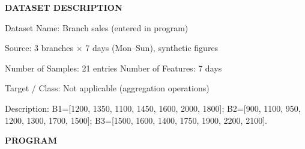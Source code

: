 \documentclass[11pt,twoside]{article}
\newcommand{\expheading}[1]{{\fontsize{14}{17}\selectfont\textbf{#1}\par}}
\begin{document}
{\expheading{DATASET DESCRIPTION}
\vspace{4pt}
\noindent Dataset Name: Branch sales (entered in program)\par
\noindent Source: 3 branches $\times$ 7 days (Mon--Sun), synthetic figures\par
\noindent Number of Samples: 21 entries \hspace{0.3cm} Number of Features: 7 days\par
\noindent Target / Class: Not applicable (aggregation operations)\par
\noindent Description: B1=[1200, 1350, 1100, 1450, 1600, 2000, 1800]; B2=[900, 1100, 950, 1200, 1300, 1700, 1500]; B3=[1500, 1600, 1400, 1750, 1900, 2200, 2100]. \par
\vspace{4pt}
} %

\newpage
\expheading{PROGRAM}
\vspace{6pt}
\end{document}
